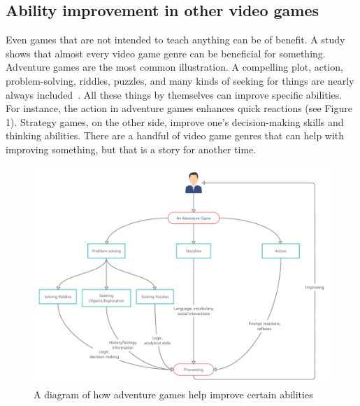 \documentclass[10pt,twoside,english,a4paper]{article}
\begin{document}
\subsection{Ability improvement in other video games}
Even games that are not intended to teach anything can be of benefit. A study shows that almost every video game genre can be beneficial for something. Adventure games are the most common illustration. A compelling plot, action, problem-solving, riddles, puzzles, and many kinds of seeking for things are nearly always included~\cite{learning}. All these things by themselves can improve specific abilities. For instance, the action in adventure games enhances quick reactions (see Figure 1). Strategy games, on the other side, improve one's decision-making skills and thinking abilities. There are a handful of video game genres that can help with improving something, but that is a story for another time. 

\begin{figure}[h]
\centering
\includegraphics[scale=0.27]{adventure}
\caption{A diagram of how adventure games help improve certain abilities}
\end{figure}
\end{document}
